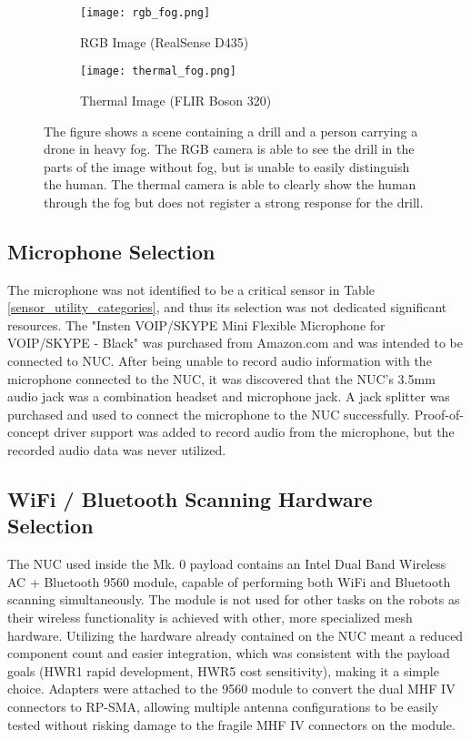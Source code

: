 \begin{figure}
	\centering
	\begin{subfigure}{0.45\textwidth}
		\centering
		\texttt{[image: rgb\_fog.png]}
		\caption{RGB Image (RealSense D435)}
		\label{rgb_fog}
	\end{subfigure}
	\hfill
	\begin{subfigure}{0.45\textwidth}
		\centering
		\texttt{[image: thermal\_fog.png]}
		\caption{Thermal Image (FLIR Boson 320)}
		\label{thermal_fog}
	\end{subfigure}		
	\caption[Comparison of RGB and Thermal cameras in fog]{The figure shows a scene containing a drill and a person carrying a drone in heavy fog. The RGB camera is able to see the drill in the parts of the image without fog, but is unable to easily distinguish the human. The thermal camera is able to clearly show the human through the fog but does not register a strong response for the drill.}
	\label{fog_comparison}
\end{figure}

\subsection{Microphone Selection}
The microphone was not identified to be a critical sensor in Table \ref{sensor_utility_categories}, and thus its selection was not dedicated significant resources. The "Insten VOIP/SKYPE Mini Flexible Microphone for VOIP/SKYPE - Black" was purchased from Amazon.com and was intended to be connected to NUC. After being unable to record audio information with the microphone connected to the NUC, it was discovered that the NUC's 3.5mm audio jack was a combination headset and microphone jack. A jack splitter was purchased and used to connect the microphone to the NUC successfully. Proof-of-concept driver support was added to record audio from the microphone, but the recorded audio data was never utilized.

\subsection{WiFi / Bluetooth Scanning Hardware Selection}
The NUC used inside the Mk. 0 payload contains an Intel Dual Band Wireless AC + Bluetooth 9560 module, capable of performing both WiFi and Bluetooth scanning simultaneously. The module is not used for other tasks on the robots as their wireless functionality is achieved with other, more specialized mesh hardware. Utilizing the hardware already contained on the NUC meant a reduced component count and easier integration, which was consistent with the payload goals (HWR1 rapid development, HWR5 cost sensitivity), making it a simple choice. Adapters were attached to the 9560 module to convert the dual MHF IV connectors to RP-SMA, allowing multiple antenna configurations to be easily tested without risking damage to the fragile MHF IV connectors on the module.

